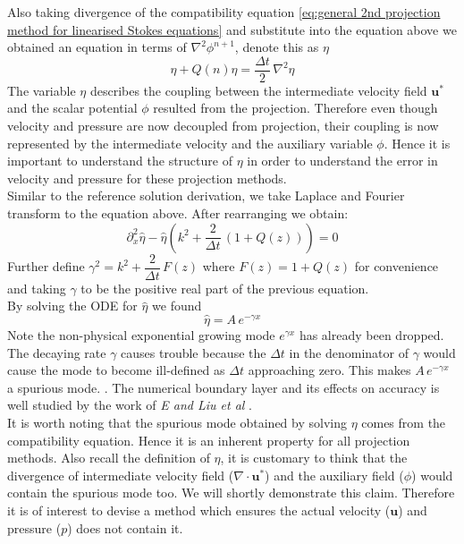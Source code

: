 Also taking divergence of the compatibility equation \eqref{eq:general 2nd projection method for linearised Stokes equations} and substitute into the equation above we obtained an equation in terms of $\nabla^2\phi^{n+1}$, denote this as $\eta$
\begin{equation*}
\eta + Q(n)\eta = \dfrac{\Delta t}{2}\, \nabla^2 \eta
\end{equation*}
The variable $\eta$ describes the coupling between the intermediate velocity field $\textbf{u}^*$ and the scalar potential $\phi$ resulted from the projection. Therefore even though velocity and pressure are now decoupled from projection, their coupling is now represented by the intermediate velocity and the auxiliary variable $\phi$. Hence it is important to understand the structure of $\eta$ in order to understand the error in velocity and pressure for these projection methods.\\

Similar to the reference solution derivation, we take Laplace and Fourier transform to the equation above. After rearranging we obtain:
\begin{equation}
\partial_x^2 \hat{\eta} - \hat{\eta} (k^2 + \dfrac{2}{\Delta t}\,(1+Q(z))) = 0
\end{equation}
Further define $\gamma^2 = k^2 + \dfrac{2}{\Delta t}\,F(z)$ where $F(z) = 1 + Q(z)$ for convenience and taking $\gamma$ to be the positive real part of the previous equation.\\

By solving the ODE for $\hat{\eta}$ we found
\begin{equation}
\hat{\eta} = A\,e^{-\gamma x}
\end{equation}
Note the non-physical exponential growing mode $e^{\gamma x}$ has already been dropped.\\

The decaying rate $\gamma$ causes trouble because the $\Delta t$ in the denominator of $\gamma$ would cause the mode to become ill-defined as $\Delta t$ approaching zero. This makes $A\,e^{-\gamma x}$ a spurious mode. \cite{brown2001accurate, strikwerda1999accuracy}. The numerical boundary layer and its effects on accuracy is well studied by the work of \emph{E and Liu et al} \cite{liu1996projection}. \\
It is worth noting that the spurious mode obtained by solving $\eta$ comes from the compatibility equation. Hence it is an inherent property for all projection methods. Also recall the definition of $\eta$, it is customary to think that the divergence of intermediate velocity field ($\nabla \cdot \textbf{u}^*$) and the auxiliary field ($\phi$) would contain the spurious mode too. We will shortly demonstrate this claim. Therefore it is of interest to devise a method which ensures the actual velocity ($\textbf{u}$) and pressure ($p$) does not contain it. \\

